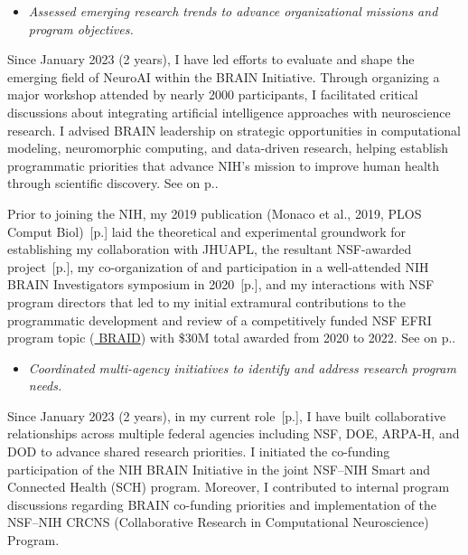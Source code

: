\documentclass[10pt]{article}
\newcommand{\unpubtitle}[1]{{\color{hopkinsblue} #1}}
\newcommand{\see}[1]{[\textcolor{hopkinsblue}{p.\pageref{sec:#1}}]}
\newcommand{\cf}[1]{\textcolor{hopkinsblue}{See \emph{\nameref{sec:#1}} on p.\pageref{sec:#1}}}
\begin{document}
\begin{itemize}
  \color{hopkinsblue}
  \item \emph{Assessed emerging research trends to advance organizational
missions and program objectives.}
\end{itemize}

Since January 2023 (2 years), I have led efforts to evaluate and shape the
emerging field of NeuroAI within the BRAIN Initiative. Through organizing a
major workshop attended by nearly 2000 participants, I facilitated critical
discussions about integrating artificial intelligence approaches with
neuroscience research. I advised BRAIN leadership on strategic opportunities
in computational modeling, neuromorphic computing, and data-driven research,
helping establish programmatic priorities that advance NIH's mission to improve
human health through scientific discovery. \cf{jobobd}.

Prior to joining the NIH, my 2019 publication (Monaco et al., 2019, PLOS
Comput Biol)~\see{pubs} laid the theoretical and experimental groundwork
for establishing my collaboration with JHUAPL, the resultant NSF-awarded
project~\see{funding}, my co-organization of and participation in a
well-attended NIH BRAIN Investigators symposium in 2020~\see{symposium}, and
my interactions with NSF program directors that led to my initial extramural
contributions to the programmatic development and review of a competitively
funded NSF EFRI program topic (\href{https://www.nsf.gov/awardsearch/advancedSearchResult?PIId=&PIFirstName=&PILastName=&PIOrganization=&PIState=&PIZip=&PICountry=&ProgOrganization=07040000&ProgEleCode=7633&BooleanElement=All&ProgRefCode=&BooleanRef=All&Program=&ProgOfficer=&Keyword=BRAID&AwardNumberOperator=&AwardAmount=&AwardInstrument=&ActiveAwards=true&OriginalAwardDateOperator=&StartDateOperator=&ExpDateOperator=}{\unpubtitle{BRAID}}) 
with \$30M total awarded from 2020 to 2022. \cf{programsvc}.

\begin{itemize}
  \color{hopkinsblue}
  \item \emph{Coordinated multi-agency initiatives to identify and address
research program needs.}
\end{itemize}

Since January 2023 (2 years), in my current role~\see{jobobd}, I have built
collaborative relationships across multiple federal agencies including NSF,
DOE, ARPA-H, and DOD to advance shared research priorities. I initiated the
co-funding participation of the NIH BRAIN Initiative in the joint NSF--NIH Smart
and Connected Health (SCH) program. Moreover, I contributed to internal program
discussions regarding BRAIN co-funding priorities and implementation of the
NSF--NIH CRCNS (Collaborative Research in Computational Neuroscience) Program.
\end{document}
